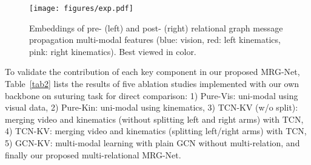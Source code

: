 \documentclass[letterpaper, 10 pt, conference]{ieeeconf}
\begin{document}
\begin{table}[t]
\begin{center}
\caption{Ablation study on key components of our method using the same backbone on JIGSAWS Suturing dataset.}
\label{tab2}
\end{center}
\end{table}

\begin{figure}[t]
\centering
\vspace{-6mm}
\texttt{[image: figures/exp.pdf]}
\vspace{-2mm}
\caption{Embeddings of pre- (left) and post- (right) relational graph message propagation multi-modal features (blue: vision, red: left kinematics, pink: right kinematics). Best viewed in color.}
\label{fig4}
\vspace{-7mm}
\end{figure}

To validate the contribution of each key component in our proposed MRG-Net,
Table~\ref{tab2} lists the results of five ablation studies implemented with our own backbone on suturing task for direct comparison:
1) Pure-Vis: uni-modal using visual data,
2) Pure-Kin: uni-modal using kinematics,
3) TCN-KV (w/o split): merging video and kinematics (without splitting left and right arms) with TCN,
4) TCN-KV: merging video and kinematics (splitting left/right arms) with TCN,
5) GCN-KV: multi-modal learning with plain GCN without multi-relation,
and finally our proposed multi-relational MRG-Net.
\end{document}
